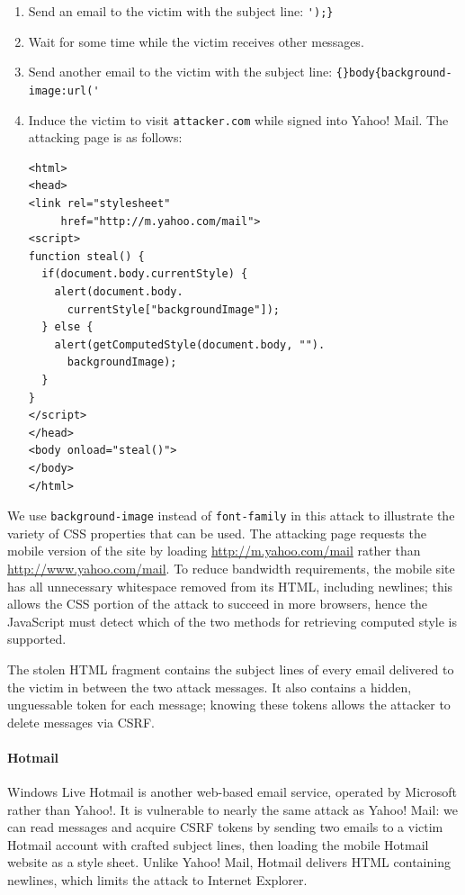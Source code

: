 \documentclass{acm_proc_article-sp}
\begin{document}
\begin{enumerate}
\item Send an email to the victim with the subject line:
  \verb|');}|
\item Wait for some time while the victim receives other messages.
\item Send another email to the victim with the subject line:
  \verb|{}body{background-image:url('|
\item Induce the victim to visit \texttt{attacker.com} while signed
  into Yahoo! Mail.  The attacking page is as follows:
\begin{verbatim}
<html>
<head>
<link rel="stylesheet"
     href="http://m.yahoo.com/mail">
<script>
function steal() {
  if(document.body.currentStyle) {
    alert(document.body.
      currentStyle["backgroundImage"]);
  } else {
    alert(getComputedStyle(document.body, "").
      backgroundImage);
  }
}
</script>
</head>
<body onload="steal()">
</body>
</html>
\end{verbatim}
\end{enumerate}

We use \texttt{background-image} instead of \texttt{font-family} in
this attack to illustrate the variety of CSS properties that can be
used.  The attacking page requests the mobile version of the site by
loading \url{http://m.yahoo.com/mail} rather than
\url{http://www.yahoo.com/mail}.  To reduce bandwidth requirements,
the mobile site has all unnecessary whitespace removed from its HTML,
including newlines; this allows the CSS portion of the attack to
succeed in more browsers, hence the JavaScript must detect which of
the two methods for retrieving computed style is supported.

The stolen HTML fragment contains the subject lines of every email
delivered to the victim in between the two attack messages.  It also
contains a hidden, unguessable token for each message; knowing these
tokens allows the attacker to delete messages via CSRF.

\paragraph{Hotmail}
Windows Live Hotmail is another web-based email service, operated by
Microsoft rather than Yahoo!.  It is vulnerable to nearly the same
attack as Yahoo! Mail: we can read messages and acquire CSRF tokens by
sending two emails to a victim Hotmail account with crafted subject
lines, then loading the mobile Hotmail website as a style sheet.
Unlike Yahoo! Mail, Hotmail delivers HTML containing newlines, which
limits the attack to Internet Explorer.
\end{document}
